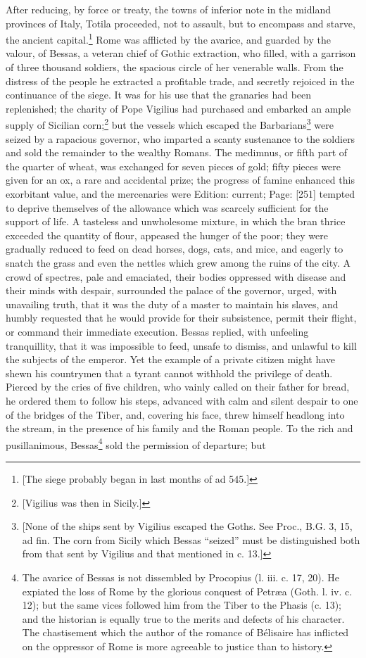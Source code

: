 After reducing, by force or treaty, the towns of inferior note in the midland provinces of Italy, Totila proceeded, not to assault, but to encompass and starve, the ancient capital.\footnote{[The siege probably began in last months of ad 545.]} Rome was afflicted by the avarice, and guarded by the valour, of Bessas, a veteran chief of Gothic extraction, who filled, with a garrison of three thousand soldiers, the spacious circle of her venerable walls. From the distress of the people he extracted a profitable trade, and secretly rejoiced in the continuance of the siege. It was for his use that the granaries had been replenished; the charity of Pope Vigilius had purchased and embarked an ample supply of Sicilian corn;\footnote{[Vigilius was then in Sicily.]} but the vessels which escaped the Barbarians\footnote{[None of the ships sent by Vigilius escaped the Goths. See Proc., B.G. 3, 15, ad fin. The corn from Sicily which Bessas \texthebrew{“}seized\texthebrew{}” must be distinguished both from that sent by Vigilius and that mentioned in c. 13.]} were seized by a rapacious governor, who imparted a scanty sustenance to the soldiers and sold the remainder to the wealthy Romans. The medimnus, or fifth part of the quarter of wheat, was exchanged for seven pieces of gold; fifty pieces were given for an ox, a rare and accidental prize; the progress of famine enhanced this exorbitant value, and the mercenaries were Edition: current; Page: [251] tempted to deprive themselves of the allowance which was scarcely sufficient for the support of life. A tasteless and unwholesome mixture, in which the bran thrice exceeded the quantity of flour, appeased the hunger of the poor; they were gradually reduced to feed on dead horses, dogs, cats, and mice, and eagerly to snatch the grass and even the nettles which grew among the ruins of the city. A crowd of spectres, pale and emaciated, their bodies oppressed with disease and their minds with despair, surrounded the palace of the governor, urged, with unavailing truth, that it was the duty of a master to maintain his slaves, and humbly requested that he would provide for their subsistence, permit their flight, or command their immediate execution. Bessas replied, with unfeeling tranquillity, that it was impossible to feed, unsafe to dismiss, and unlawful to kill the subjects of the emperor. Yet the example of a private citizen might have shewn his countrymen that a tyrant cannot withhold the privilege of death. Pierced by the cries of five children, who vainly called on their father for bread, he ordered them to follow his steps, advanced with calm and silent despair to one of the bridges of the Tiber, and, covering his face, threw himself headlong into the stream, in the presence of his family and the Roman people. To the rich and pusillanimous, Bessas\footnote{The avarice of Bessas is not dissembled by Procopius (l. iii. c. 17, 20). He expiated the loss of Rome by the glorious conquest of Petræa (Goth. l. iv. c. 12); but the same vices followed him from the Tiber to the Phasis (c. 13); and the historian is equally true to the merits and defects of his character. The chastisement which the author of the romance of Bélisaire has inflicted on the oppressor of Rome is more agreeable to justice than to history.} sold the permission of departure; but 